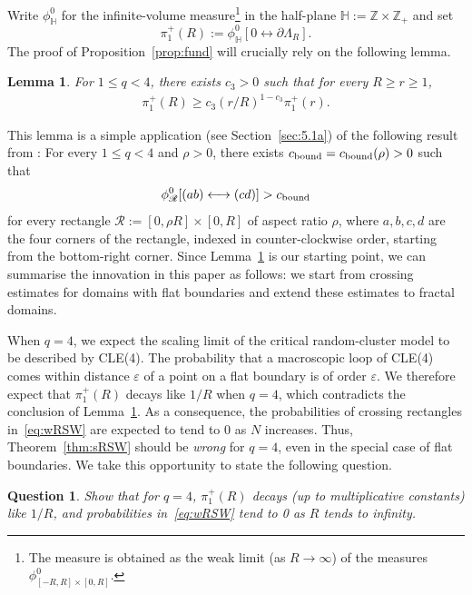 \documentclass[a4paper,oneside,11pt]{article}
\newtheorem{lemma}[theorem]{Lemma}
\newtheorem{question}[conj]{Question}
\numberwithin{equation}{section}
\numberwithin{equation}{section}
\numberwithin{equation}{section}
\newcommand{\calR}{\mathcal{R}}
\newcommand{\bbH}{\mathbb{H}}
\newcommand{\ep}{\varepsilon}
\renewcommand{\ep}{\varepsilon}
\begin{document}
Write $\phi_{\mathbb H}^0$ for the infinite-volume measure\footnote{The measure is obtained as the weak limit (as $R\rightarrow\infty$) of the measures $\phi_{[-R,R] \times [0,R]}^0$.} in the half-plane $\mathbb H:=\mathbb Z\times\mathbb Z_+$
and set 
\begin{equation}
 \pi_1^+(R):=\phi_{\bbH}^0[0\longleftrightarrow\partial\Lambda_R].
\end{equation}
The proof of Proposition~\ref{prop:fund} will crucially rely on the following lemma. 

\begin{lemma}\label{lem:mn}
    For $1\le q<4$, there exists $c_3>0$ such that for every $R\ge r\ge1$, 
    \begin{align*}
    	\pi_1^+(R)\ge c_3(r/R)^{1-c_3}\pi_1^+(r).
	\end{align*}
\end{lemma}

This lemma is a simple application (see Section~\ref{sec:5.1a}) of the following result from \cite{DumSidTas16}: 
For every $1\le q<4$ and $\rho>0$, there exists $c_{\rm bound}=c_{\rm bound}(\rho)>0$ such that 
\begin{equation}\label{eq:wRSW}
	\phi_{\calR}^0[(ab)\longleftrightarrow(cd)]>c_{\rm bound}
\end{equation}
for every rectangle $\calR:=[0,\rho R]\times[0,R]$ of aspect ratio $\rho$, where $a,b,c,d$ are the four corners of the rectangle, indexed in counter-clockwise order, starting from the bottom-right corner.
Since Lemma~\ref{lem:mn} is our starting point, we can summarise the innovation in this paper as follows:
we start from crossing estimates for domains with flat boundaries and extend these estimates to fractal domains. 

When $q=4$, we expect the scaling limit of the critical random-cluster model to be described by CLE(4). 
The probability that a macroscopic loop of CLE(4) comes within distance $\ep$ of a point on a flat boundary is of order $\ep$. 
We therefore expect that $\pi_1^+(R)$ decays like $1/R$ when $q=4$, which contradicts the conclusion of Lemma~\ref{lem:mn}.
As a consequence, the probabilities of crossing rectangles in~\eqref{eq:wRSW} are expected to tend to $0$ as $N$ increases. 
Thus, Theorem~\ref{thm:sRSW} should be {\em wrong} for $q=4$, even in the special case of flat boundaries. 
We take this opportunity to state the following question.
\begin{question}
Show that for $q=4$, $\pi_1^+(R)$ decays (up to multiplicative constants) like $1/R$, and
 probabilities  in~\eqref{eq:wRSW}  tend to 0 as $R$ tends to infinity.
\end{question}
\end{document}

